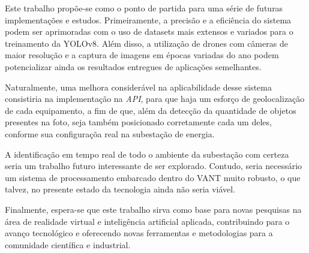 Este trabalho propõe-se como o ponto de partida para uma série de futuras implementações e estudos. Primeiramente, a precisão e a eficiência do sistema podem ser aprimoradas com o uso de datasets mais extensos e variados para o treinamento da YOLOv8. Além disso, a utilização de drones com câmeras de maior resolução e a captura de imagens em épocas variadas do ano podem potencializar ainda os resultados entregues de aplicações semelhantes.

Naturalmente, uma melhora considerável na aplicabilidade desse sistema consistiria na implementação na \textit{API}, para que haja um esforço de geolocalização de cada equipamento, a fim de que, além da detecção da quantidade de objetos presentes na foto, seja também posicionado corretamente cada um deles, conforme sua configuraçõa real na subestação de energia. 

A identificação em tempo real de todo o ambiente da subestação com certeza seria um trabalho futuro interessante de ser explorado. Contudo, seria necessário um sistema de processamento embarcado dentro do VANT muito robusto, o que talvez, no presente estado da tecnologia ainda não seria viável.
 
Finalmente, espera-se que este trabalho sirva como base para novas pesquisas na área de realidade virtual e inteligência artificial aplicada, contribuindo para o avanço tecnológico e oferecendo novas ferramentas e metodologias para a comunidade científica e industrial.
